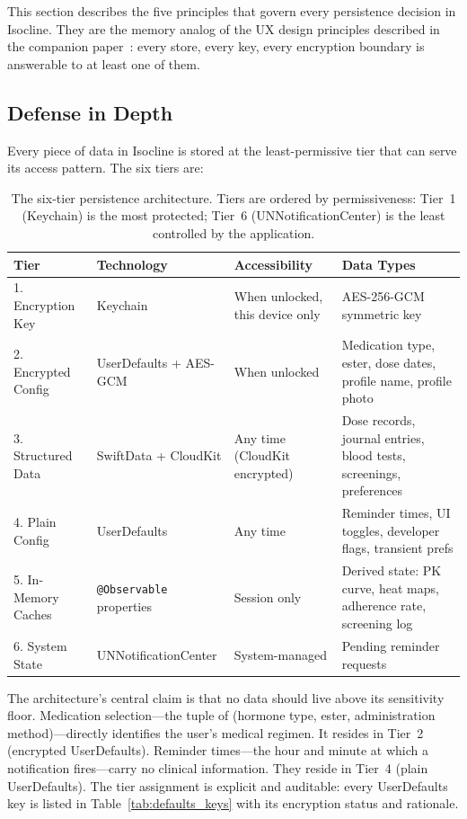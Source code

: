 \documentclass[11pt,a4paper]{article}
\newcommand{\code}[1]{\texttt{\small #1}}
\begin{document}
This section describes the five principles that govern every persistence
decision in Isocline. They are the memory analog of the UX design principles
described in the companion paper~\cite{xtux}: every store, every key, every
encryption boundary is answerable to at least one of them.

\subsection{Defense in Depth}
\label{sec:defense_in_depth}

Every piece of data in Isocline is stored at the least-permissive tier that can
serve its access pattern. The six tiers are:

\begin{table}[h]
\centering
\small
\begin{tabular}{@{}p{2.2cm}p{3.2cm}p{2.4cm}p{6.8cm}@{}}
\toprule
\textbf{Tier} & \textbf{Technology} & \textbf{Accessibility} & \textbf{Data Types} \\
\midrule
1. Encryption Key & Keychain & When unlocked, this device only &
   AES-256-GCM symmetric key \\
\midrule
2. Encrypted Config & UserDefaults + AES-GCM & When unlocked &
   Medication type, ester, dose dates, profile name, profile photo \\
\midrule
3. Structured Data & SwiftData + CloudKit & Any time (CloudKit encrypted) &
   Dose records, journal entries, blood tests, screenings, preferences \\
\midrule
4. Plain Config & UserDefaults & Any time &
   Reminder times, UI toggles, developer flags, transient prefs \\
\midrule
5. In-Memory Caches & \code{@Observable} properties & Session only &
   Derived state: PK curve, heat maps, adherence rate, screening log \\
\midrule
6. System State & UNNotificationCenter & System-managed &
   Pending reminder requests \\
\bottomrule
\end{tabular}
\caption{The six-tier persistence architecture. Tiers are ordered by
permissiveness: Tier~1 (Keychain) is the most protected; Tier~6
(UNNotificationCenter) is the least controlled by the application.}
\label{tab:tiers}
\end{table}

The architecture's central claim is that no data should live above its
sensitivity floor. Medication selection---the tuple of (hormone type, ester,
administration method)---directly identifies the user's medical regimen. It
resides in Tier~2 (encrypted UserDefaults). Reminder times---the hour and
minute at which a notification fires---carry no clinical information. They
reside in Tier~4 (plain UserDefaults). The tier assignment is explicit and
auditable: every UserDefaults key is listed in
Table~\ref{tab:defaults_keys} with its encryption status and rationale.
\end{document}
